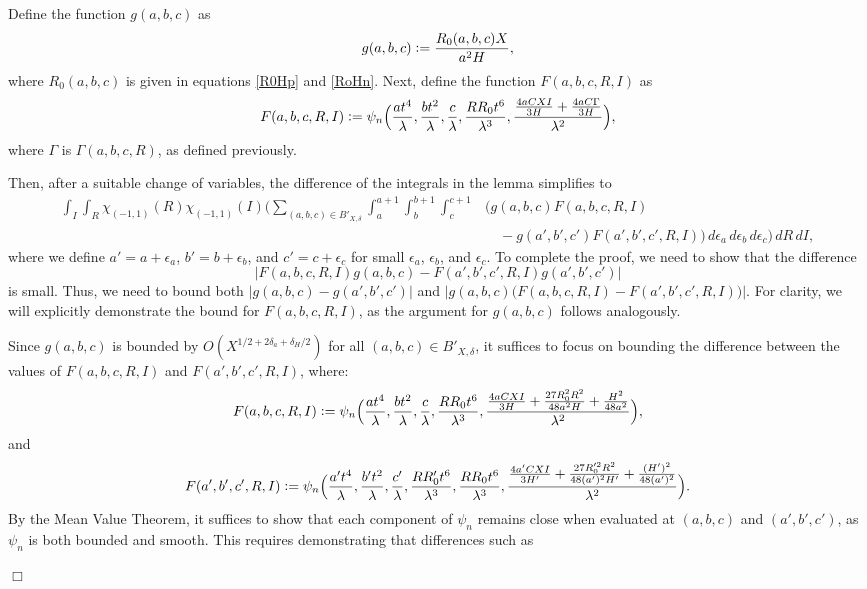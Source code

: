 \documentclass{article}
\newenvironment{proof}{\noindent {\bf Proof:}}{$\Box$ \vspace{2 ex}}
\begin{document}
 
\begin{proof}  Define the function $g(a, b, c)$ as  
\begin{equation*}
    g(a, b, c) \vcentcolon= \frac{R_0(a, b, c) X}{a^2 H},
\end{equation*}  
where $R_0(a,b,c)$ is given in equations \eqref{R0Hp} and \eqref{RoHn}.  
Next, define the function $F(a, b, c, R, I)$ as
\begin{equation*}
    F(a, b, c, R, I) \vcentcolon= \psi_{n} \Big( \frac{at^4}{\lambda}, \frac{bt^2}{\lambda}, \frac{c}{\lambda}, \frac{RR_0 t^6}{\lambda^3}, \frac{\frac{4aCXI}{3H} + \frac{4aC\Gamma}{3H}}{\lambda^2} \Big),
\end{equation*}
where $\Gamma$ is $\Gamma(a,b,c,R)$, as defined previously.

Then, after a suitable change of variables, the difference of the integrals in the lemma simplifies to
\begin{align*} 
\int_{I} \int_{R}  \chi_{(-1,1)}(R) \chi_{(-1,1)}(I) \Big( \sum_{(a,b,c)\in B'_{X,\delta}} \int_{a}^{a+1} \int_{b}^{b+1} \int_{c}^{c+1} & \Big( g(a,b,c) F(a, b, c, R, I) \\
&\quad - g(a',b',c') F(a', b', c', R, I) \Big) \, d\epsilon_a \, d\epsilon_b \, d\epsilon_c \Big)\, dR \, dI,
\end{align*}
where we define $a' = a + \epsilon_a$, $b' = b + \epsilon_b$, and $c' = c + \epsilon_c$ for small $\epsilon_a$, $\epsilon_b$, and $\epsilon_c$.
\noindent To complete the proof, we need to show that the difference 
\[
\left| F(a, b, c, R, I) g(a, b, c) - F(a', b', c', R, I) g(a', b', c') \right|
\]
is small. Thus, we need to bound both $|g(a, b, c) - g(a', b', c')|$ and $|g(a,b,c)\big(F(a, b, c, R, I) - F(a', b', c', R, I)\big)|$. For clarity, we will explicitly demonstrate the bound for $F(a, b, c, R, I)$, as the argument for $g(a, b, c)$ follows analogously.

Since $g(a, b, c)$ is bounded by $O(X^{1/2 + 2 \delta_a + \delta_H/2})$ for all $(a, b, c) \in B'_{X, \delta}$, it suffices to focus on bounding the difference between the values of $F(a, b, c, R, I)$ and $F(a', b', c', R, I)$, where:
\begin{equation*}
F(a, b, c, R, I) \vcentcolon= \psi_{n} \Big( \frac{a t^4}{\lambda}, \frac{b t^2}{\lambda}, \frac{c}{\lambda}, \frac{R R_0 t^6}{\lambda^3}, \frac{\frac{4aCXI}{3H} +  \frac{27 R_0^2R^2}{48 a^2 H} + \frac{H^2}{48 a^2}}{\lambda^2}\Big),
\end{equation*}
and
\begin{equation*}
F(a', b', c', R, I) \vcentcolon= \psi_{n} \Big( \frac{a' t^4}{\lambda}, \frac{b' t^2}{\lambda}, \frac{c'}{\lambda}, \frac{R R_0' t^6}{\lambda^3}, \frac{R R_0 t^6}{\lambda^3}, \frac{\frac{4a'CXI}{3H'} +  \frac{27 R_0'^2R^2}{48 (a')^2 H'} + \frac{(H')^2}{48 (a')^2}}{\lambda^2} \Big).
\end{equation*}
By the Mean Value Theorem, it suffices to show that each component of $\psi_{n}$ remains close when evaluated at $(a, b, c)$ and $(a', b', c')$, as $\psi_{n}$ is both bounded and smooth. This requires demonstrating that differences such as


\end{proof}
\end{document}
